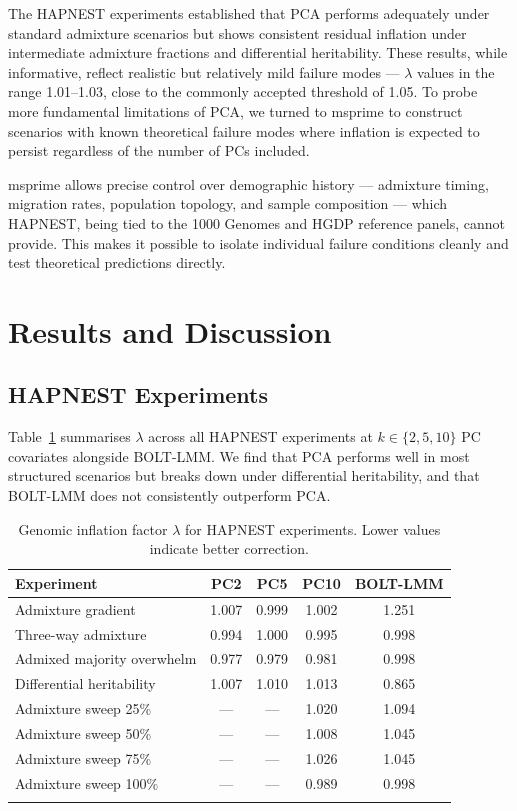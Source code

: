 \documentclass[unnumsec,webpdf,contemporary,large]{oup-authoring-template}
\theoremstyle{thmstyleone}
\theoremstyle{thmstyletwo}
\theoremstyle{thmstylethree}
\begin{document}
The HAPNEST experiments established that PCA performs adequately under standard admixture scenarios but shows consistent residual inflation under intermediate admixture fractions and differential heritability. These results, while informative, reflect realistic but relatively mild failure modes — $\lambda$ values in the range 1.01--1.03, close to the commonly accepted threshold of 1.05. To probe more fundamental limitations of PCA, we turned to msprime to construct scenarios with known theoretical failure modes where inflation is expected to persist regardless of the number of PCs included.

msprime allows precise control over demographic history — admixture timing, migration rates, population topology, and sample composition — which HAPNEST, being tied to the 1000 Genomes and HGDP reference panels, cannot provide. This makes it possible to isolate individual failure conditions cleanly and test theoretical predictions directly.

\section{Results and Discussion}

\subsection{HAPNEST Experiments}

Table~\ref{tab:hapnest} summarises $\lambda$ across all HAPNEST experiments at $k \in \{2, 5, 10\}$ PC covariates alongside BOLT-LMM. We find that PCA performs well in most structured scenarios but breaks down under differential heritability, and that BOLT-LMM does not consistently outperform PCA.

\begin{table}[!t]
\caption{Genomic inflation factor $\lambda$ for HAPNEST experiments. Lower values indicate better correction.\label{tab:hapnest}}
\begin{tabular*}{\columnwidth}{@{\extracolsep\fill}lcccc@{\extracolsep\fill}}
\toprule
Experiment & PC2 & PC5 & PC10 & BOLT-LMM \\
\midrule
Admixture gradient         & 1.007 & 0.999 & 1.002 & 1.251 \\
Three-way admixture        & 0.994 & 1.000 & 0.995 & 0.998 \\
Admixed majority overwhelm & 0.977 & 0.979 & 0.981 & 0.998 \\
Differential heritability  & 1.007 & 1.010 & 1.013 & 0.865 \\
Admixture sweep 25\%       & —     & —     & 1.020 & 1.094 \\
Admixture sweep 50\%       & —     & —     & 1.008 & 1.045 \\
Admixture sweep 75\%       & —     & —     & 1.026 & 1.045 \\
Admixture sweep 100\%      & —     & —     & 0.989 & 0.998 \\
\botrule
\end{tabular*}
\end{table}
\end{document}
